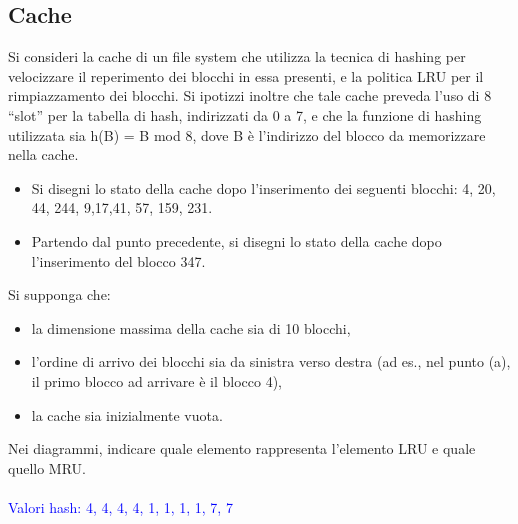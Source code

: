 \documentclass[12pt]{article}
\begin{document}
\subsection{Cache}
Si consideri la cache di un file system che utilizza la tecnica di hashing per velocizzare il
reperimento dei blocchi in essa presenti, e la politica LRU per il rimpiazzamento dei blocchi. Si
ipotizzi inoltre che tale cache preveda l'uso di 8 “slot” per la tabella di hash, indirizzati da 0 a 7, e
che la funzione di hashing utilizzata sia h(B) = B mod 8, dove B è l'indirizzo del blocco da
memorizzare nella cache.
\begin{itemize}
    \item Si disegni lo stato della cache dopo l'inserimento dei seguenti blocchi: 4, 20, 44, 244,
    9,17,41, 57, 159, 231.
    \item Partendo dal punto precedente, si disegni lo stato della cache dopo l'inserimento del blocco
    347.
\end{itemize}
Si supponga che:
\begin{itemize}
    \item la dimensione massima della cache sia di 10 blocchi,
    \item l'ordine di arrivo dei blocchi sia da sinistra verso destra (ad es., nel punto (a), il primo
    blocco ad arrivare è il blocco 4),
    \item la cache sia inizialmente vuota.
\end{itemize}
Nei diagrammi, indicare quale elemento rappresenta l'elemento LRU e quale quello MRU.\\\\
\textcolor{blue}{Valori hash: 4, 4, 4, 4, 1, 1, 1, 1, 7, 7}
\end{document}
